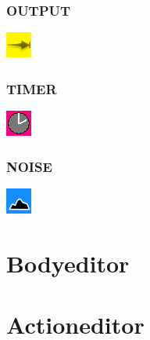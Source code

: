 \documentclass{scrartcl}
\begin{document}
\subsubsection{OUTPUT}
\includegraphics{../gui/pics/editor_logo_output.png}
\subsubsection{TIMER}
\includegraphics{../gui/pics/editor_logo_timer.png}
\subsubsection{NOISE}
\includegraphics{../gui/pics/editor_logo_noise.png}

\section{Bodyeditor}

\section{Actioneditor}
\end{document}

